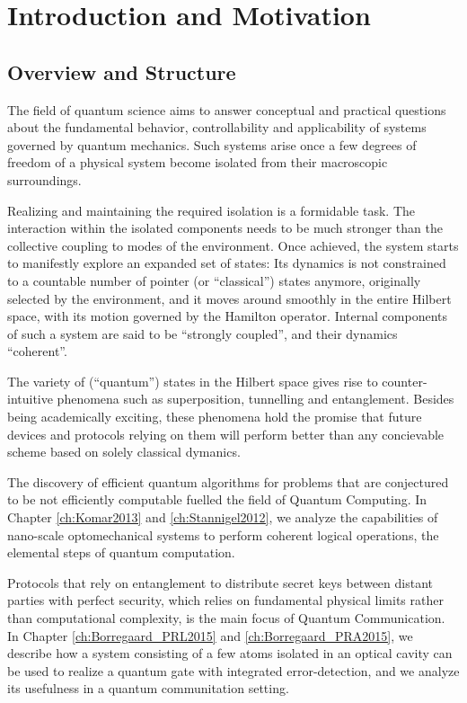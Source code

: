 \chapter{Introduction and Motivation}

\section{Overview and Structure}
The field of quantum science aims to answer conceptual and practical questions
about the fundamental behavior, controllability and applicability of 
systems governed by quantum mechanics. Such systems arise once a few 
degrees of freedom of a physical system become isolated from their macroscopic
surroundings. 

Realizing and maintaining the required isolation is a formidable
task. The interaction within the isolated components needs to be
much stronger than the collective coupling to modes of the environment.
Once achieved, the system starts to manifestly explore an expanded set of states: Its
dynamics is not constrained to a countable number of pointer (or
``classical'') states anymore, originally selected by the environment, and it
moves around smoothly in the entire Hilbert space, with its motion governed by the
Hamilton operator. Internal components of such a system are said to be ``strongly
coupled'', and their dynamics ``coherent''.

The variety of (``quantum'') states in the Hilbert space  gives rise
to counter-intuitive phenomena such as superposition, tunnelling and
entanglement.
Besides being academically exciting, these phenomena hold the promise that
future devices and protocols relying on them will perform better than any
concievable scheme based on solely classical dymanics. 

The discovery of
efficient quantum algorithms for problems that are conjectured to be not
efficiently computable fuelled the field of Quantum Computing. In Chapter
\ref{ch:Komar2013} and \ref{ch:Stannigel2012}, we analyze the
capabilities of nano-scale optomechanical systems to perform coherent logical
operations, the elemental steps of quantum computation.

Protocols that
rely on entanglement to distribute secret keys between distant parties with
perfect security, which relies on fundamental physical limits rather than
computational complexity, is the main focus of Quantum Communication. In Chapter
\ref{ch:Borregaard_PRL2015} and \ref{ch:Borregaard_PRA2015}, we describe how a system consisting of a few atoms
isolated in an optical cavity can be used to realize a quantum gate with
integrated error-detection, and we analyze its usefulness in a quantum
communitation setting.

